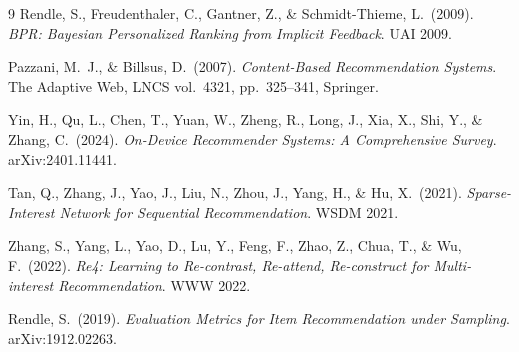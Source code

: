 \documentclass[11pt,a4paper]{article}
\begin{document}
\begin{thebibliography}{9}
Rendle, S., Freudenthaler, C., Gantner, Z., \& Schmidt-Thieme, L.\ (2009).
\textit{BPR: Bayesian Personalized Ranking from Implicit Feedback}.
UAI 2009.

Pazzani, M.\ J., \& Billsus, D.\ (2007).
\textit{Content-Based Recommendation Systems}.
The Adaptive Web, LNCS vol.\ 4321, pp.\ 325--341, Springer.

Yin, H., Qu, L., Chen, T., Yuan, W., Zheng, R., Long, J., Xia, X., Shi, Y., \& Zhang, C.\ (2024).
\textit{On-Device Recommender Systems: A Comprehensive Survey}.
arXiv:2401.11441.

Tan, Q., Zhang, J., Yao, J., Liu, N., Zhou, J., Yang, H., \& Hu, X.\ (2021).
\textit{Sparse-Interest Network for Sequential Recommendation}.
WSDM 2021.

Zhang, S., Yang, L., Yao, D., Lu, Y., Feng, F., Zhao, Z., Chua, T., \& Wu, F.\ (2022).
\textit{Re4: Learning to Re-contrast, Re-attend, Re-construct for Multi-interest Recommendation}.
WWW 2022.

Rendle, S.\ (2019).
\textit{Evaluation Metrics for Item Recommendation under Sampling}.
arXiv:1912.02263.

\end{thebibliography}
\end{document}
